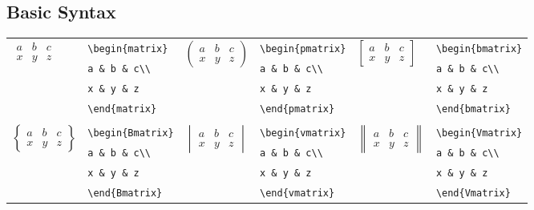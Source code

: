 \documentclass[10pt, english]{article}
\begin{document}
	\subsection{Basic Syntax}

	\begin{center}
		\scriptsize
	\begin{tabular}{ll|ll|ll}
		\multirow{4}{*}{$\begin{matrix}a&b&c\\x&y&z\end{matrix}$} & \verb|\begin{matrix}| & \multirow{4}{*}{$\begin{pmatrix}a&b&c\\x&y&z\end{pmatrix}$} & \verb|\begin{pmatrix}| & \multirow{4}{*}{$\begin{bmatrix}a&b&c\\x&y&z\end{bmatrix}$} & \verb|\begin{bmatrix}|\\ 
		& \verb|a & b & c\\| & & \verb|a & b & c\\| & & \verb|a & b & c\\|\\ 
		& \verb|x & y & z| & & \verb|x & y & z| & & \verb|x & y & z|\\ 
		& \verb|\end{matrix}| & & \verb|\end{pmatrix}| & & \verb|\end{bmatrix}|\\
		\multicolumn{2}{l|}{} & \multicolumn{2}{l|}{} & \multicolumn{2}{l}{}\\
                \multirow{4}{*}{$\begin{Bmatrix}a&b&c\\x&y&z\end{Bmatrix}$} & \verb|\begin{Bmatrix}| & \multirow{4}{*}{$\begin{vmatrix}a&b&c\\x&y&z\end{vmatrix}$} & \verb|\begin{vmatrix}| & \multirow{4}{*}{$\begin{Vmatrix}a&b&c\\x&y&z\end{Vmatrix}$} & \verb|\begin{Vmatrix}|\\
                & \verb|a & b & c\\| & & \verb|a & b & c\\| & & \verb|a & b & c\\|\\
                & \verb|x & y & z| & & \verb|x & y & z| & & \verb|x & y & z|\\
                & \verb|\end{Bmatrix}| & & \verb|\end{vmatrix}| & & \verb|\end{Vmatrix}|\\
	\end{tabular}
	\end{center}
\end{document}
